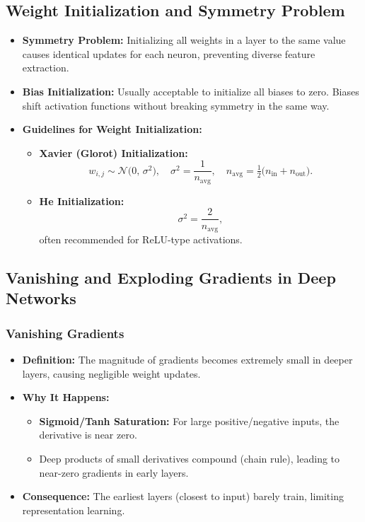\documentclass{article}
\begin{document}
\subsection{Weight Initialization and Symmetry Problem}
\begin{itemize}
    \item \textbf{Symmetry Problem:} Initializing all weights in a layer to the same value causes identical updates for each neuron, preventing diverse feature extraction.
    \item \textbf{Bias Initialization:} Usually acceptable to initialize all biases to zero. Biases shift activation functions without breaking symmetry in the same way.
    \item \textbf{Guidelines for Weight Initialization:}
    \begin{itemize}
        \item \textbf{Xavier (Glorot) Initialization:} 
        \[
        w_{i,j} \sim \mathcal{N}\!\bigl(0,\,\sigma^2\bigr), 
        \quad 
        \sigma^2 = \frac{1}{n_{\text{avg}}}, 
        \quad
        n_{\text{avg}} = \tfrac{1}{2}\bigl(n_{\text{in}} + n_{\text{out}}\bigr).
        \]
        \item \textbf{He Initialization:} 
        \[
        \sigma^2 = \frac{2}{n_{\text{avg}}},
        \]
        often recommended for ReLU-type activations.
    \end{itemize}
\end{itemize}

\subsection{Vanishing and Exploding Gradients in Deep Networks}

\subsubsection{Vanishing Gradients}
\begin{itemize}
    \item \textbf{Definition:} The magnitude of gradients becomes extremely small in deeper layers, causing negligible weight updates.
    \item \textbf{Why It Happens:}
    \begin{itemize}
        \item \textbf{Sigmoid/Tanh Saturation:} For large positive/negative inputs, the derivative is near zero.
        \item Deep products of small derivatives compound (chain rule), leading to near-zero gradients in early layers.
    \end{itemize}
    \item \textbf{Consequence:} The earliest layers (closest to input) barely train, limiting representation learning.
\end{itemize}
\end{document}
